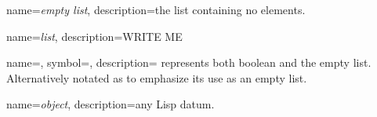 {
  name={\sl empty list},
  description={the \gls{list} containing no elements.}
}


{
  name={\sl list},
  description={WRITE ME}
}


{
  name={},
  symbol={\lsp{()}},
  description={%
    represents both boolean  and the \gls{empty list}.
    Alternatively notated as 
    to emphasize its use as an \gls{empty list}.
  }
}


{
  name={\sl object},
  description={any Lisp datum.}
}
